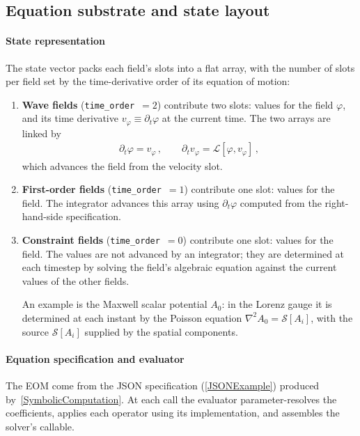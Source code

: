 \subsection{Equation substrate and state layout}%
\label{EquationSubstrate}

\paragraph*{State representation} The \TIDAL{} state vector packs each
field's slots into a flat array, with the number of slots per field
set by the time-derivative order of its equation of motion:
\begin{enumerate}
  \item \textbf{Wave fields} (\lstinline!time_order!~$=2$) contribute
    two slots: values for the field $\varphi$, and
    its time derivative
    $v_\varphi \equiv \partial_t \varphi$ at the current time. The two arrays
    are linked by
    \begin{align}
      \partial_t \varphi = v_\varphi
      \, ,
      \qquad
      \partial_t v_\varphi = \mathcal{L}[\varphi, v_\varphi]
      \, ,
      \label{ELVelocityForm}
    \end{align}
    which advances the field from the velocity slot.
  \item \textbf{First-order fields} (\lstinline!time_order!~$=1$)
    contribute one slot: values for the field. The
    integrator advances this array using $\partial_t \varphi$ computed from
    the right-hand-side specification.
  \item \textbf{Constraint fields} (\lstinline!time_order!~$=0$)
    contribute one slot: values for the field. The values
    are not advanced by an integrator; they are determined at
    each timestep by solving the field's algebraic equation
    against the
    current values of the other fields.

  An example is the Maxwell scalar
  potential $A_0$: in the Lorenz gauge it
  is determined at each instant by the
  Poisson equation $\nabla^2 A_0 = \mathcal{S}[A_i]$, with the source
  $\mathcal{S}[A_i]$ supplied by the spatial components.
\end{enumerate}

\paragraph*{Equation specification and evaluator}
The EOM come from the JSON specification (\cref{JSONExample})
produced by~\cref{SymbolicComputation}. At each call the evaluator
parameter-resolves the coefficients, applies each operator using its
implementation, and assembles the solver's callable.

